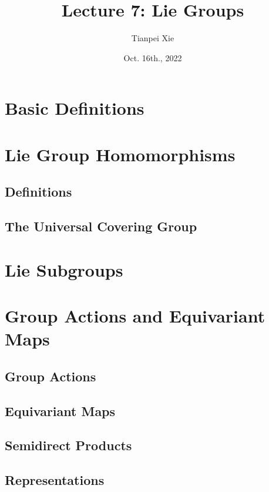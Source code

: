 \documentclass[11pt]{article}
\begin{document}
\title{Lecture 7: Lie Groups}
\author{ Tianpei Xie}
\date{Oct. 16th., 2022}
\maketitle
\tableofcontents
\newpage
\section{Basic Definitions}

\section{Lie Group Homomorphisms}
\subsection{Definitions}
\subsection{The Universal Covering Group}

\section{Lie Subgroups}

\section{Group Actions and Equivariant Maps}
\subsection{Group Actions}

\subsection{Equivariant Maps}

\subsection{Semidirect Products}

\subsection{Representations}



\newpage


\end{document}
